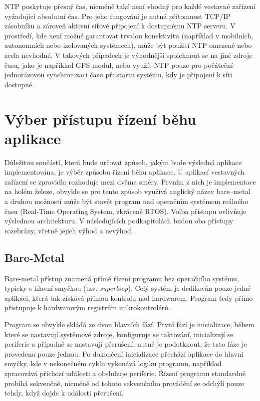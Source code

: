 NTP poskytuje přesný čas, nicméně také není vhodný pro každé vestavné zařízení vyžadující absolutní čas. Pro jeho fungování je nutná přítomnost TCP/IP zásobníku a zároveň aktivní síťové připojení k dostupnému NTP serveru. V prostředí, kde není možné garantovat trvalou konektivitu (například v mobilních, autonomních nebo izolovaných systémech), může být použití NTP omezené nebo zcela nevhodné. V takových případech je výhodnější spolehnout se na jiné zdroje času, jako je například GPS modul, nebo využít NTP pouze pro počáteční jednorázovou synchronizaci času při startu systému, kdy je připojení k síti dostupné.

\section{Výber přístupu řízení běhu aplikace}
Důležitou součástí, která bude určovat způsob, jakým bude výsledná aplikace implementována, je výběr způsobu řízení běhu aplikace. U aplikací vestavných zařízení se zpravidla rozhoduje mezi dvěma směry. Prvním z nich je implementace na holém železe, obvykle se pro tento způsob využívá anglický název bare--metal a druhou možností může být stavět program nad operačním systémem reálného času (Real-Time Operating System, zkráceně RTOS). Volba přístupu ovlivňuje výslednou architekturu. V následujících podkapitolách budou oba přístupy rozebrány, včetně jejich výhod a nevýhod. 


\subsection{Bare-Metal}
Bare-metal přístup znamená přímé řízení programu bez operačního systému, typicky s hlavní smyčkou (tzv. \emph{superloop}). Celý systém je dedikován pouze jedné aplikaci, která tak získává přímou kontrolu nad hardwarem. Program tedy přímo přistupuje k hardwarovým registrům mikrokontrolérů. 

Program se obvykle skládá ze dvou hlavních fází. První fází je inicializace, během které se nastavují systémové zdroje, konfiguruje se taktování, inicializují se periferie a případně se nastavují přerušení, nutné je podotknout, že tato fáze je provedena pouze jednou. Po dokončení inicializace přechází aplikace do hlavní smyčky, kde v nekonečném cyklu vykonává logiku programu, například zpracovává příchozí události a obsluhuje periferie. Řízení programu standardně probíhá sekvenčně, nicméně od tohoto sekvenčního provádění se odchýlí pouze tehdy, když dojde k události přerušení.

